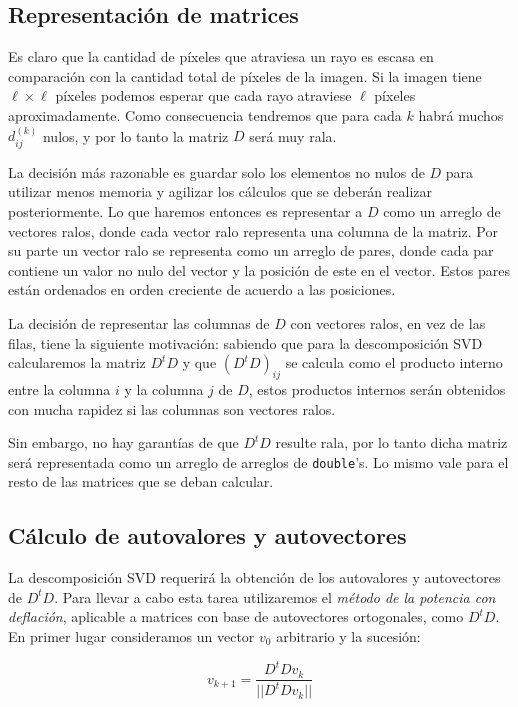 \documentclass[a4paper]{article}
\begin{document}
\subsection{Representación de matrices}

Es claro que la cantidad de píxeles que atraviesa un rayo es escasa en comparación con la cantidad total de píxeles de la imagen. Si la imagen  
tiene $\ell \times \ell$ píxeles podemos esperar que cada rayo atraviese $\ell$ píxeles aproximadamente. Como consecuencia tendremos que para cada $k$ 
habrá muchos $d_{ij}^{(k)}$ nulos, y por lo tanto la matriz $D$ será muy rala.

La decisión más razonable es guardar solo los elementos no nulos de $D$ para utilizar menos memoria y agilizar los cálculos que se deberán 
realizar posteriormente. Lo que haremos entonces es representar a $D$ como un arreglo de vectores ralos, donde cada vector ralo representa 
una columna de la matriz. Por su parte un vector ralo se representa como un arreglo de pares, donde cada par contiene un valor no nulo del 
vector y la posición de este en el vector. Estos pares están ordenados en orden creciente de acuerdo a las posiciones.

La decisión de representar las columnas de $D$ con vectores ralos, en vez de las filas, tiene la siguiente motivación: sabiendo que para 
la descomposición SVD calcularemos la matriz $D^t D$ y que $(D^t D)_{ij}$ se calcula como el producto interno entre la columna $i$ y la columna 
$j$ de $D$, estos productos internos serán obtenidos con mucha rapidez si las columnas son vectores ralos.

Sin embargo, no hay garantías de que $D^t D$ resulte rala, por lo tanto dicha matriz será representada como un arreglo de arreglos de 
\texttt{double}'s. Lo mismo vale para el resto de las matrices que se deban calcular.

\subsection{Cálculo de autovalores y autovectores}

La descomposición SVD requerirá la obtención de los autovalores y autovectores de $D^t D$. Para llevar a cabo esta tarea utilizaremos el 
\textit{método de la potencia con deflación}, aplicable a matrices con base de autovectores ortogonales, como $D^tD$. En primer lugar consideramos 
un vector $v_0$ arbitrario y la sucesión:

\[
v_{k+1} = \frac{D^tD v_k}{||D^tD v_k||}
\]
\end{document}
